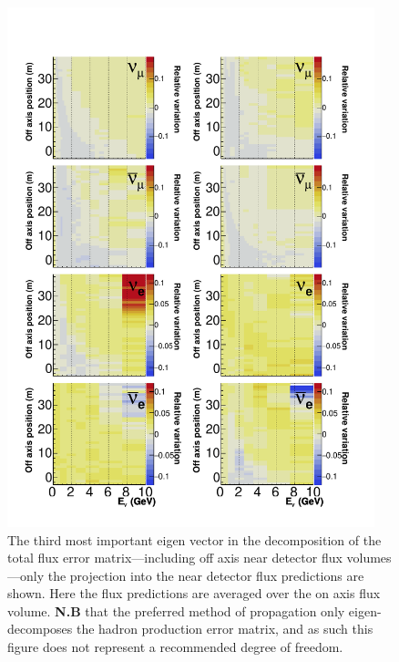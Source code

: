 \documentclass{article}
\begin{document}
\begin{figure}
  \centering
  \includegraphics[width=0.95\textwidth]{plots/EvUncerts_offaxis_component_2}
  \caption{The third most important eigen vector in the decomposition of the total flux error matrix---including off axis near detector flux volumes---only the projection into the near detector flux predictions are shown. Here the flux predictions are averaged over the on axis flux volume. \textbf{N.B} that the preferred method of propagation only eigen-decomposes the hadron production error matrix, and as such this figure does not represent a recommended degree of freedom.}
  \label{fig:evfreedom_offaxis_c2}
\end{figure}
\end{document}
